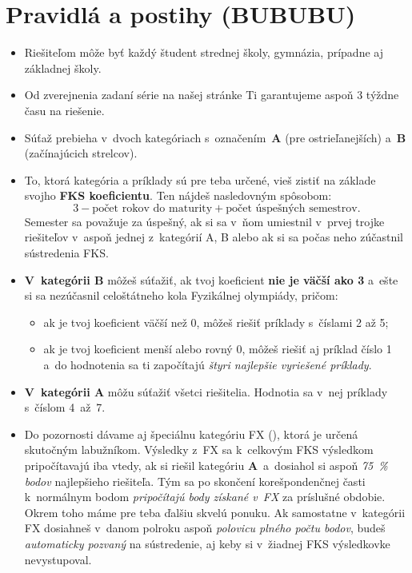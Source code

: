 \pagestyle{rules}

\section{Pravidlá a postihy (BUBUBU)}
\begin{itemize}
	\item Riešiteľom môže byť každý študent strednej školy, gymnázia, prípadne aj základnej školy.
	
	\item Od zverejnenia zadaní série na našej stránke Ti garantujeme aspoň 3 týždne času na riešenie.

	\item Súťaž prebieha v~dvoch kategóriach s~označením~\textbf{A} (pre ostrieľanejších) a~\textbf{B} (začínajúcich strelcov). 

	\item To, ktorá kategória a príklady sú pre teba určené, vieš zistiť na základe svojho \textbf{FKS koeficientu}. 
		Ten nájdeš nasledovným spôsobom:
		$$3 - \text{počet rokov do maturity} + \text{počet úspešných semestrov.}$$
		Semester sa považuje za úspešný, ak si sa v~ňom umiestnil v~prvej trojke riešiteľov v~aspoň jednej z~kategórií A, B 
		alebo ak si sa počas neho zúčastnil sústredenia FKS.
    
	\item \textbf{V~kategórii B} môžeš súťažiť, ak tvoj koeficient \textbf{nie je väčší ako 3} 
		a~ešte si sa nezúčasnil celoštátneho kola Fyzikálnej olympiády, pričom:
		\begin{itemize}
			\item ak je tvoj koeficient väčší než 0, môžeš riešiť príklady s~číslami 2 až 5;
			\item ak je tvoj koeficient menší alebo rovný 0, môžeš riešiť aj príklad číslo 1 a~do hodnotenia sa ti započítajú \emph{štyri najlepšie vyriešené príklady}.
		\end{itemize}

	\item \textbf{V~kategórii A} môžu súťažiť všetci riešitelia. Hodnotia sa v~nej príklady s~číslom 4~až~7.

	\item Do pozornosti dávame aj špeciálnu kategóriu FX (),
		ktorá je určená skutočným labužníkom. Výsledky z~FX sa k~celkovým FKS výsledkom 
		pripočítavajú iba vtedy, ak si riešil kategóriu \textbf{A}~a~dosiahol si aspoň \emph{\SI{75}{\percent} bodov} najlepšieho riešiteľa.
		Tým sa po skončení korešpondenčnej časti k~normálnym bodom \emph{pripočítajú body
		získané v~FX} za príslušné obdobie. Okrem toho máme pre teba ďalšiu skvelú ponuku.
		Ak samostatne v~kategórii FX dosiahneš v~danom polroku aspoň \emph{polovicu plného počtu
		bodov}, budeš \emph{automaticky pozvaný} na sústredenie, aj keby si v~žiadnej FKS
		výsledkovke nevystupoval.


\end{itemize}
